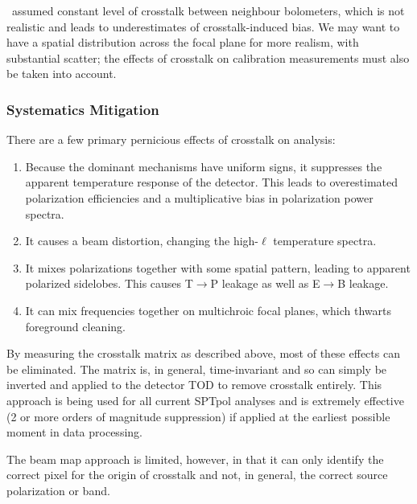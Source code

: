 \pb\ assumed constant level of crosstalk between neighbour bolometers, which is not realistic and leads to underestimates of crosstalk-induced bias.
We may want to have a spatial distribution across the focal plane for more realism, with substantial scatter; the effects of crosstalk on calibration measurements must also be taken into account.

\subsubsection{Systematics Mitigation}

There are a few primary pernicious effects of crosstalk on analysis:
\begin{enumerate}
\item{Because the dominant mechanisms have uniform signs, it suppresses the apparent temperature response of the detector. This leads to overestimated polarization efficiencies and a multiplicative bias in polarization power spectra.}
\item{It causes a beam distortion, changing the high-$\ell$ temperature spectra.}
\item{It mixes polarizations together with some spatial pattern, leading to apparent polarized sidelobes. This causes T$\rightarrow$P leakage as well as E$\rightarrow$B leakage.}
\item{It can mix frequencies together on multichroic focal planes, which thwarts foreground cleaning.}
\end{enumerate}

By measuring the crosstalk matrix as described above, most of these effects can be eliminated.
The matrix is, in general, time-invariant and so can simply be inverted and applied to the detector TOD to remove crosstalk entirely.
This approach is being used for all current SPTpol analyses and is extremely effective (2 or more orders of magnitude suppression) if applied at the earliest possible moment in data processing.

The beam map approach is limited, however, in that it can only identify the correct pixel for the origin of crosstalk and not, in general, the correct source polarization or band.


